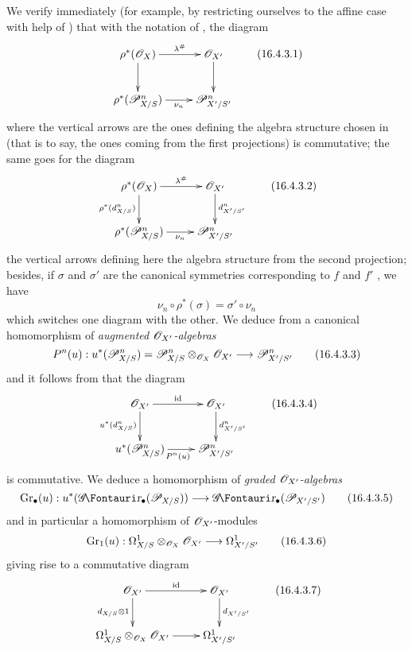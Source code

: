 \begin{env}[16.4.3]
\label{IV.16.4.3}
We verify immediately (for example, by restricting ourselves to the affine case with help of ) that with the notation of , the diagram
\[
  \label{IV.16.4.3.1}
  \xymatrix{
    \rho^*(\sh{O}_X) \ar[r]^-{\lambda^\#} \ar[d] & \sh{O}_{X'} \ar[d] \\
    \rho^*(\sh{P}_{X/S}^n) \ar[r]_-{\nu_n} & \sh{P}_{X'/S'}^n  
  }
  \tag{16.4.3.1}
\]
where the vertical arrows are the ones defining the algebra structure chosen in  (that is to say, the ones coming from the first projections) is commutative;
the same goes for the diagram
\[
  \label{IV.16.4.3.2}
  \xymatrix{
    \rho^*(\sh{O}_X) \ar[r]^-{\lambda^\#} \ar[d]_-{\rho^*(d_{X/S}^n)} & \sh{O}_{X'} \ar[d]^-{d_{X'/S'}^n} \\
    \rho^*(\sh{P}_{X/S}^n) \ar[r]_-{\nu_n} & \sh{P}_{X'/S'}^n  
  }
  \tag{16.4.3.2}
\]
the vertical arrows defining here the algebra structure from the second projection;
besides, if $\sigma$ and $\sigma'$ are the canonical symmetries corresponding to $f$ and $f'$ , we have
\[
  \nu_n \circ \rho^*(\sigma) = \sigma' \circ \nu_n 
\] 
which switches one diagram with the other.
We deduce from  a canonical homomorphism of \emph{augmented $\mathscr{O}_{X'}$-algebras}
\[
  \label{IV.16.4.3.3}
  P^n(u): u^*(\sh{P}_{X/S}^n) = \sh{P}_{X/S}^n \otimes_{\sh{O}_X} \sh{O}_{X'} \to \sh{P}_{X'/S'}^n 
  \tag{16.4.3.3}
\]
and it follows from  that the diagram 
\[
  \label{IV.16.4.3.4}
  \xymatrix{
    \sh{O}_{X'} \ar[r]^-{\operatorname{id}} \ar[d]_-{u^*(d_{X/S}^n)}  & \sh{O}_{X'} \ar[d]^-{d_{X'/S'}^n} \\
    u^*(\sh{P}_{X/S}^n) \ar[r]_{P^n(u)} & \sh{P}_{X'/S'}^n
  }
  \tag{16.4.3.4}
\]
is commutative.
We deduce a homomorphism of \emph{graded $\mathscr{O}_{X'}$-algebras}
\[
  \label{IV.16.4.3.5}
  \Gr_\bullet(u):u^*(\shGr_\bullet(\sh{P}_{X/S})) \to \shGr_\bullet(\sh{P}_{X'/S'})
  \tag{16.4.3.5}
\]
and in particular a homomorphism of $\mathscr{O}_{X'}$-modules 
\[
  \label{IV.16.4.3.6}
  \Gr_1(u):\Omega_{X/S}^1 \otimes_{\sh{O}_X} \sh{O}_{X'} \to \Omega_{X'/S'}^1
  \tag{16.4.3.6}
\]
giving rise to a commutative diagram
\[
  \label{IV.16.4.3.7}
  \xymatrix{
    \sh{O}_{X'} \ar[r]^-{\operatorname{id}} \ar[d]_-{d_{X/S} \otimes 1}  & \sh{O}_{X'} \ar[d]^-{d_{X'/S'}} \\
    \Omega_{X/S}^1 \otimes_{\sh{O}_X} \sh{O}_{X'} \ar[r] & \Omega_{X'/S'}^1
  }
  \tag{16.4.3.7}
\]
\end{env}

